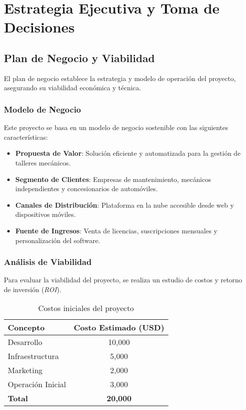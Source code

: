 \chapter{Estrategia Ejecutiva y Toma de Decisiones}

\section{Plan de Negocio y Viabilidad}

El plan de negocio establece la estrategia y modelo de operación del proyecto, asegurando su viabilidad económica y técnica.

\subsection{Modelo de Negocio}
Este proyecto se basa en un modelo de negocio sostenible con las siguientes características:
\begin{itemize}
	\item \textbf{Propuesta de Valor}: Solución eficiente y automatizada para la gestión de talleres mecánicos.
	\item \textbf{Segmento de Clientes}: Empresas de mantenimiento, mecánicos independientes y concesionarios de automóviles.
	\item \textbf{Canales de Distribución}: Plataforma en la nube accesible desde web y dispositivos móviles.
	\item \textbf{Fuente de Ingresos}: Venta de licencias, suscripciones mensuales y personalización del software.
\end{itemize}

\subsection{Análisis de Viabilidad}
Para evaluar la viabilidad del proyecto, se realiza un estudio de costos y retorno de inversión (\textit{ROI}).

\begin{table}[h]
	\centering
	\begin{tabular}{|l|c|}
		\hline
		\textbf{Concepto} & \textbf{Costo Estimado (USD)} \\ \hline
		Desarrollo & 10,000 \\ \hline
		Infraestructura & 5,000 \\ \hline
		Marketing & 2,000 \\ \hline
		Operación Inicial & 3,000 \\ \hline
		\textbf{Total} & \textbf{20,000} \\ \hline
	\end{tabular}
	\caption{Costos iniciales del proyecto}
\end{table}

